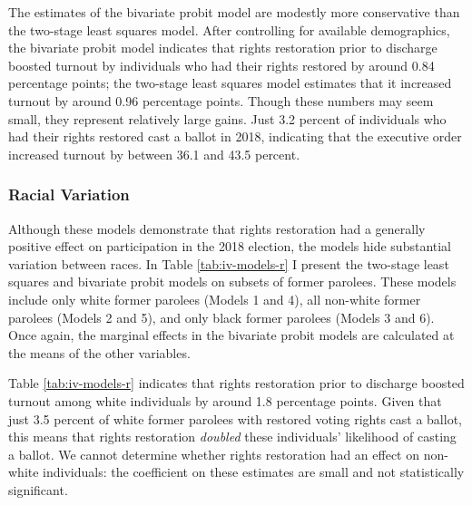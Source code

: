\documentclass[
  12pt,
]{article}
\begin{document}
The estimates of the bivariate probit model are modestly more conservative than the two-stage least squares model. After controlling for available demographics, the bivariate probit model indicates that rights restoration prior to discharge boosted turnout by individuals who had their rights restored by around 0.84 percentage points; the two-stage least squares model estimates that it increased turnout by around 0.96 percentage points. Though these numbers may seem small, they represent relatively large gains. Just 3.2 percent of individuals who had their rights restored cast a ballot in 2018, indicating that the executive order increased turnout by between 36.1 and 43.5 percent.

\hypertarget{racial-variation}{%
\subsubsection*{Racial Variation}\label{racial-variation}}

Although these models demonstrate that rights restoration had a generally positive effect on participation in the 2018 election, the models hide substantial variation between races. In Table \ref{tab:iv-models-r} I present the two-stage least squares and bivariate probit models on subsets of former parolees. These models include only white former parolees (Models 1 and 4), all non-white former parolees (Models 2 and 5), and only black former parolees (Models 3 and 6). Once again, the marginal effects in the bivariate probit models are calculated at the means of the other variables.



Table \ref{tab:iv-models-r} indicates that rights restoration prior to discharge boosted turnout among white individuals by around 1.8 percentage points. Given that just 3.5 percent of white former parolees with restored voting rights cast a ballot, this means that rights restoration \emph{doubled} these individuals' likelihood of casting a ballot. We cannot determine whether rights restoration had an effect on non-white individuals: the coefficient on these estimates are small and not statistically significant.
\end{document}
